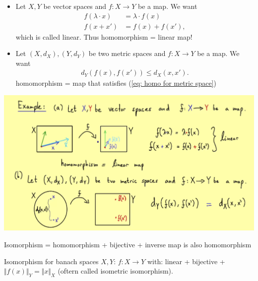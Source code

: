 \documentclass[../../note.tex]{subfiles}
\begin{document}
\begin{example}
    \begin{itemize}
        \item Let $X,Y$ be vector spaces and $f: X \rightarrow Y$ be a map. We want
        \begin{align}
            f(\lambda \cdot x)
            &= \lambda \cdot f(x) \\
            f(x+x')
            &= f(x) + f(x'),
        \end{align}
        which is called linear. Thus homomorphism = linear map!
        \item Let $(X,d_X), (Y,d_Y)$ be two metric spaces and $f: X \rightarrow Y$ be a map. We want 
        \begin{align}
            d_Y(f(x),f(x'))\leq d_X(x,x').
            \label{eq: homo for metric space}
        \end{align}
        homomorphism = map that satisfies (\ref{eq: homo for metric space})
    \end{itemize}
\end{example}
\includegraphics[scale = 0.25]{../figures/homomorphism.png}

\begin{definition}[Isomorphism]
    Isomorphism = homomorphism + bijective + inverse map is also homomorphism
\end{definition}

\begin{definition}
    Isomorphism for banach spaces $X,Y$: $f: X \rightarrow Y$ with: linear + bijective + $\Vert f(x) \Vert_Y = \Vert x \Vert_X$ (oftern called isometric isomorphism).
\end{definition}
\end{document}
